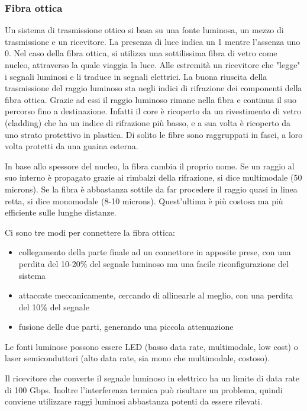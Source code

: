\subsubsection{Fibra ottica}
Un sistema di trasmissione ottico si basa su una fonte luminosa, un mezzo di trasmissione e un ricevitore.
La presenza di luce indica un 1 mentre l'assenza uno 0.
Nel caso della fibra ottica, si utilizza una sottilissima fibra di vetro come nucleo, attraverso la quale viaggia la luce. 
Alle estremità un ricevitore che "legge" i segnali luminosi e li traduce in segnali elettrici.
La buona riuscita della trasmissione del raggio luminoso sta negli indici di rifrazione dei componenti della fibra ottica. 
Grazie ad essi il raggio luminoso rimane nella fibra e continua il suo percorso fino a destinazione.
Infatti il core è ricoperto da un rivestimento di vetro (cladding) che ha un indice di rifrazione più basso, e a sua volta è ricoperto da uno strato protettivo in plastica.
Di solito le fibre sono raggruppati in fasci, a loro volta protetti da una guaina esterna.

In base allo spessore del nucleo, la fibra cambia il proprio nome.
Se un raggio al suo interno è propagato grazie ai rimbalzi della rifrazione, si dice multimodale (50 microns).
Se la fibra è abbastanza sottile da far procedere il raggio quasi in linea retta, si dice monomodale (8-10 microns).
Quest'ultima è più costosa ma più efficiente sulle lunghe distanze.

Ci sono tre modi per connettere la fibra ottica:
\begin{itemize}
\item collegamento della parte finale ad un connettore in apposite prese, con una perdita del 10-20\% del segnale luminoso ma una facile riconfigurazione del sistema
\item attaccate meccanicamente, cercando di allinearle al meglio, con una perdita del 10\% del segnale
\item fusione delle due parti, generando una piccola attenuazione
\end{itemize}

Le fonti luminose possono essere LED (basso data rate, multimodale, low cost) o laser semiconduttori (alto data rate, sia mono che multimodale, costoso).

Il ricevitore che converte il segnale luminoso in elettrico ha un limite di data rate di 100 Gbps.
Inoltre l'interferenza termica può risultare un problema, quindi conviene utilizzare raggi luminosi abbastanza potenti da essere rilevati.


